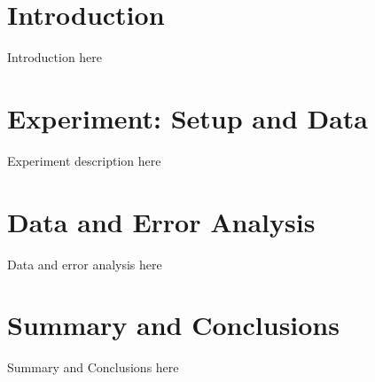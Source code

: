 \documentclass[12pt]{article}
\begin{document}
\section{Introduction}

Introduction here

\section{Experiment: Setup and Data}

Experiment description here

\section{Data and Error Analysis}

Data and error analysis here

\section{Summary and Conclusions}

Summary and Conclusions here
\end{document}
